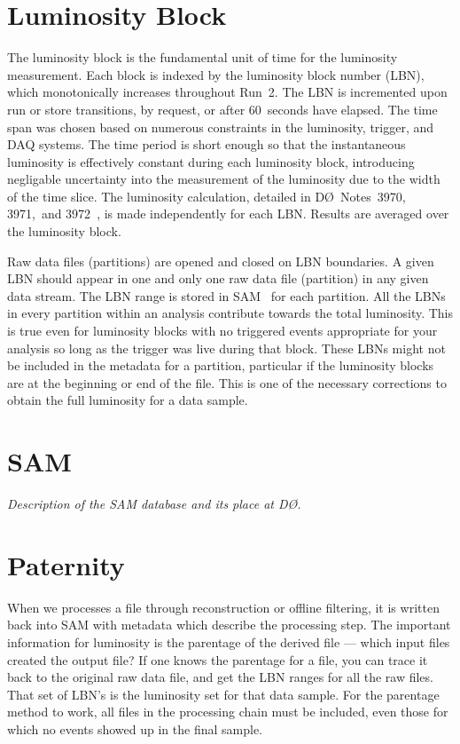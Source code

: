 \documentclass[12pt]{article}
\begin{document}
\section{Luminosity Block}

The luminosity block is the fundamental unit of time for the
luminosity measurement.  Each block is indexed by the luminosity block
number (LBN), which monotonically increases throughout Run~2.  The LBN
is incremented upon run or store transitions, by request, or after
60~seconds have elapsed.  The time span was chosen based on numerous
constraints in the luminosity, trigger, and DAQ systems.  The time
period is short enough so that the instantaneous luminosity is
effectively constant during each luminosity block, introducing
negligable uncertainty into the measurement of the luminosity due to
the width of the time slice.  The luminosity calculation, detailed in
D\O~Notes~3970, 3971,~and 3972~\cite{3970,3971,3972}, is made
independently for each LBN.  Results are averaged over the luminosity
block.

Raw data files (partitions) are opened and closed on LBN boundaries.
A given LBN should appear in one and only one raw data file
(partition) in any given data stream.  The LBN range is stored in
SAM~\cite{3465} for each partition.  All the LBNs in every partition
within an analysis contribute towards the total luminosity.  This is
true even for luminosity blocks with no triggered events appropriate
for your analysis so long as the trigger was live during that block.
These LBNs might not be included in the metadata for a partition,
particular if the luminosity blocks are at the beginning or end of the
file.  This is one of the necessary corrections to obtain the full
luminosity for a data sample.

\section{SAM}

{\it Description of the SAM database and its place at D\O.}


\section{Paternity}

When we processes a file through reconstruction or offline filtering,
it is written back into SAM with metadata which describe the
processing step.  The important information for luminosity is the
parentage of the derived file --- which input files created the output
file?  If one knows the parentage for a file, you can trace it back to
the original raw data file, and get the LBN ranges for all the raw
files.  That set of LBN's is the luminosity set for that data sample.
For the parentage method to work, all files in the processing chain
must be included, even those for which no events showed up in the
final sample.
\end{document}
